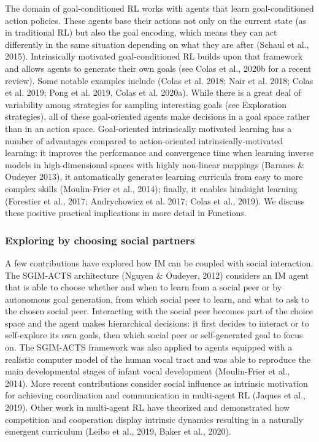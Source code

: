 The domain of goal-conditioned RL works with agents that learn goal-conditioned action policies. These agents base their actions not only on the current state (as in traditional RL) but also the goal encoding, which means they can act differently in the same situation depending on what they are after (Schaul et al., 2015). Intrinsically motivated goal-conditioned RL builds upon that framework and allows agents to generate their own goals (see Colas et al., 2020b for a recent review). Some notable examples include (Colas et al. 2018; Nair et al. 2018; Colas et al. 2019; Pong et al. 2019, Colas et al. 2020a). While there is a great deal of variability among strategies for sampling interesting goals (see Exploration strategies), all of these goal-oriented agents make decisions in a goal space rather than in an action space. Goal-oriented intrinsically motivated learning has a number of advantages compared to action-oriented intrinsically-motivated learning: it improves the performance and convergence time when learning inverse models in high-dimensional spaces with highly non-linear mappings (Baranes \& Oudeyer 2013), it automatically generates learning curricula from easy to more complex skills (Moulin-Frier et al., 2014); finally, it enables hindsight learning (Forestier et al., 2017; Andrychowicz et al. 2017; Colas et al., 2019). We discuss these positive practical implications in more detail in Functions.

\subsubsection{Exploring by choosing social partners}
A few contributions have explored how IM can be coupled with social interaction. The SGIM-ACTS architecture (Nguyen \& Oudeyer, 2012) considers an IM agent that is able to choose whether and when to learn from a social peer or by autonomous goal generation, from which social peer to learn, and what to ask to the chosen social peer. Interacting with the social peer becomes part of the choice space and the agent makes hierarchical decisions: it first decides to interact or to self-explore its own goals, then which social peer or self-generated goal to focus on. The SGIM-ACTS framework was also applied to agents equipped with a realistic computer model of the human vocal tract and was able to reproduce the main developmental stages of infant vocal development (Moulin-Frier et al., 2014). More recent contributions consider social influence as intrinsic motivation for achieving coordination and communication in multi-agent RL (Jaques et al., 2019). Other work in multi-agent RL have theorized and demonstrated how competition and cooperation display intrinsic dynamics resulting in a naturally emergent curriculum (Leibo et al., 2019, Baker et al., 2020).

